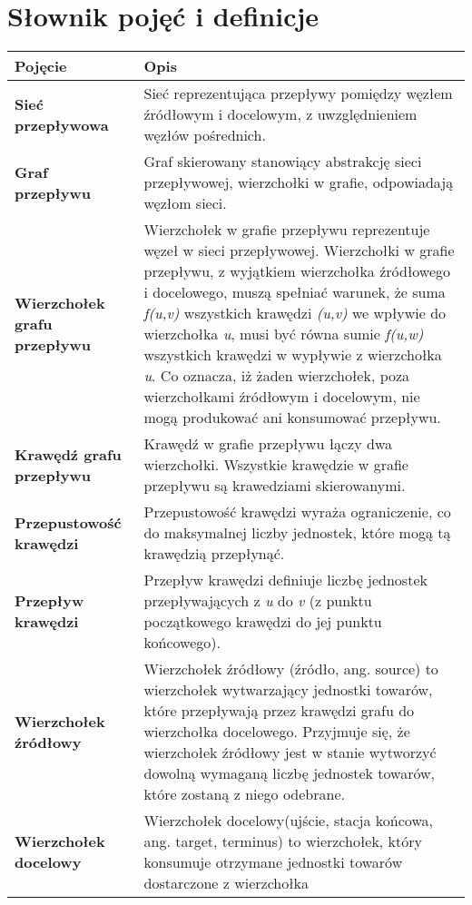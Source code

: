 \documentclass[10pt]{minutes}
\begin{document}
\section{Słownik pojęć i definicje}
  \begin{longtable}{>{\bfseries}p{} p{}}
    Pojęcie & Opis\\
    \toprule
    Sieć przepływowa  &  
    Sieć reprezentująca przepływy pomiędzy węzłem źródłowym i docelowym, z uwzględnieniem węzłów pośrednich.\\
    \midrule
    Graf przepływu &
    Graf skierowany stanowiący abstrakcję sieci przepływowej, wierzchołki w grafie, odpowiadają węzłom sieci.\\
    \midrule
    Wierzchołek grafu przepływu &
    Wierzchołek w grafie przepływu reprezentuje węzeł w sieci przepływowej. Wierzchołki w grafie przepływu, z wyjątkiem wierzchołka źródłowego 
    i docelowego, muszą spełniać warunek, że suma \emph{f(u,v)} wszystkich krawędzi \emph{(u,v)} we wpływie do wierzchołka 
    \emph{u}, musi być równa sumie \emph{f(u,w)} wszystkich krawędzi w wypływie z wierzchołka \emph{u}. Co oznacza, iż żaden wierzchołek, poza wierzchołkami 
    źródłowym i docelowym, nie mogą produkować ani konsumować przepływu.\\
    \midrule
    Krawędź grafu przepływu &
    Krawędź w grafie przepływu łączy dwa wierzchołki. Wszystkie krawędzie w grafie przepływu są krawedziami skierowanymi.\\
    \midrule
    Przepustowość krawędzi &
    Przepustowość krawędzi wyraża ograniczenie, co do maksymalnej liczby jednostek, które mogą tą krawędzią przepłynąć.\\
    \midrule
    Przepływ krawędzi &
    Przepływ krawędzi definiuje liczbę jednostek przepływających z \emph{u} do \emph{v} (z punktu początkowego krawędzi do jej punktu końcowego).\\
    \midrule
    Wierzchołek źródłowy &
    Wierzchołek źródłowy (źródło, ang. source) to wierzchołek wytwarzający jednostki towarów, które przepływają przez krawędzi grafu do wierzchołka 
    docelowego. Przyjmuje się, że wierzchołek źródłowy jest w stanie wytworzyć dowolną wymaganą liczbę jednostek towarów, które zostaną z niego odebrane.\\
    \midrule
    Wierzchołek docelowy &
    Wierzchołek docelowy(ujście, stacja końcowa, ang. target, terminus) to wierzchołek, który konsumuje otrzymane jednostki towarów dostarczone z wierzchołka 

\end{longtable}
\end{document}
